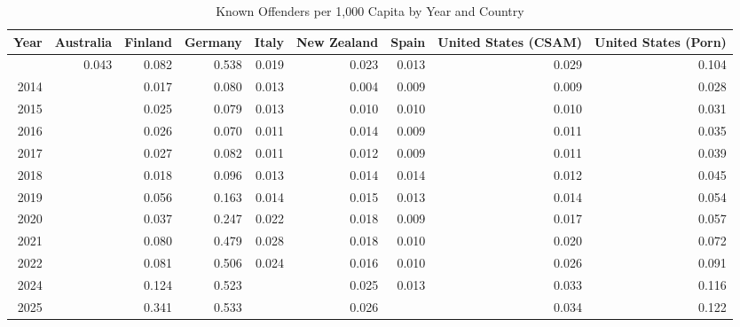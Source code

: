 \begin{table}[!t]
\caption*{
{\large Known Offenders per 1,000 Capita by Year and Country}
} 

\fontsize{12.0pt}{14.4pt}\selectfont

\begin{tabular*}{\linewidth}{@{\extracolsep{\fill}}rrrrrrrrr}
\toprule
Year & Australia & Finland & Germany & Italy & New Zealand & Spain & United States (CSAM) & United States (Porn) \\ 
\midrule\addlinespace[2.5pt]
2023 & 0.043 & 0.082 & 0.538 & 0.019 & 0.023 & 0.013 & 0.029 & 0.104 \\
2014 &  & 0.017 & 0.080 & 0.013 & 0.004 & 0.009 & 0.009 & 0.028 \\
2015 &  & 0.025 & 0.079 & 0.013 & 0.010 & 0.010 & 0.010 & 0.031 \\
2016 &  & 0.026 & 0.070 & 0.011 & 0.014 & 0.009 & 0.011 & 0.035 \\
2017 &  & 0.027 & 0.082 & 0.011 & 0.012 & 0.009 & 0.011 & 0.039 \\
2018 &  & 0.018 & 0.096 & 0.013 & 0.014 & 0.014 & 0.012 & 0.045 \\
2019 &  & 0.056 & 0.163 & 0.014 & 0.015 & 0.013 & 0.014 & 0.054 \\
2020 &  & 0.037 & 0.247 & 0.022 & 0.018 & 0.009 & 0.017 & 0.057 \\
2021 &  & 0.080 & 0.479 & 0.028 & 0.018 & 0.010 & 0.020 & 0.072 \\
2022 &  & 0.081 & 0.506 & 0.024 & 0.016 & 0.010 & 0.026 & 0.091 \\
2024 &  & 0.124 & 0.523 &  & 0.025 & 0.013 & 0.033 & 0.116 \\
2025 &  & 0.341 & 0.533 &  & 0.026 &  & 0.034 & 0.122 \\
\bottomrule
\end{tabular*}

\end{table}
